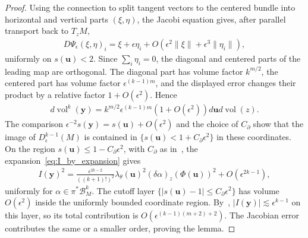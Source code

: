 \documentclass[11pt,reqno]{amsproc}
\numberwithin{equation}{section}
\newcommand{\by}{\mathbf{y}}
\newcommand{\bu}{\mathbf{u}}
\newcommand{\cB}{\mathcal{B}}
\newcommand{\ls}{\lesssim}
\newcommand{\vol}{\operatorname{vol}}
\newcommand{\dvol}{d\!\vol}
\theoremstyle{definition}
\theoremstyle{plain}
\begin{document}
\begin{proof}
    Using the connection to split tangent vectors to the centered bundle into horizontal and vertical parts $(\xi,\eta)$, the Jacobi equation gives, after parallel transport back to $T_zM$,
    \begin{align}
        D\Psi_\epsilon(\xi,\eta)_i
        =\xi+\epsilon\eta_i+O\left(\epsilon^2\|\xi\|+\epsilon^3\|\eta_i\|\right),
    \end{align}
    uniformly on $s(\bu)<2$. Since $\sum_i\eta_i=0$, the diagonal and centered parts of the leading map are orthogonal. The diagonal part has volume factor $k^{m/2}$, the centered part has volume factor $\epsilon^{(k-1)m}$, and the displayed error changes their product by a relative factor $1+O(\epsilon^2)$. Hence
    \begin{align}
        \dvol^k(\by)=k^{m/2}\epsilon^{(k-1)m}(1+O(\epsilon^2))d\bu\dvol(z).
    \end{align}
    The comparison $\epsilon^{-2}s(\by)=s(\bu)+O(\epsilon^2)$ and the choice of $C_\partial$ show that the image of $D^{k-1}_\epsilon(M)$ is contained in $\{s(\bu)<1+C_\partial\epsilon^2\}$ in these coordinates. On the region $s(\bu)\leq 1-C_\partial\epsilon^2$, with $C_\partial$ as in~, the expansion~\eqref{eq:I_by_expansion} gives
    \begin{align}
        I(\by)^2=\frac{\epsilon^{2k-2}}{((k+1)!)^2}\lambda_\theta(\bu)^2(\delta\alpha)_z(\Phi(\bu))^2+O(\epsilon^{2k-1}),
    \end{align}
    uniformly for $\alpha\in\pi^*\cB_M^k$. The cutoff layer $\{|s(\bu)-1|\leq C_\partial\epsilon^2\}$ has volume $O(\epsilon^2)$ inside the uniformly bounded coordinate region. By~, $|I(\by)|\ls\epsilon^{k-1}$ on this layer, so its total contribution is $O(\epsilon^{(k-1)(m+2)+2})$. The Jacobian error contributes the same or a smaller order, proving the lemma.
\end{proof}
\end{document}

